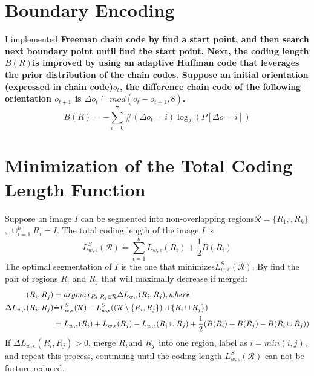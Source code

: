 \documentclass[10pt,twocolumn,letterpaper]{article}
\begin{document}
\section{Boundary Encoding}
I implemented \bf{Freeman chain code} by find a start point, and then search next boundary point until find the start point. Next, the coding length $B(R)$is improved by using an adaptive Huffman code that leverages the prior distribution of the chain codes. Suppose an initial orientation (expressed in chain code)$o_t$, the difference chain code of the following orientation $o_{t+1}$ is $\Delta o_t\dot{=}mod(o_t-o_{t+1}, 8)$.
\begin{equation}
B(R) = -\sum_{i=0}^{7}\#(\Delta o_t = i)\log_2(P[\Delta o=i])
\end{equation}
\section{Minimization of the Total Coding Length Function}
Suppose an image $I$ can be segmented into non-overlapping regions$\mathcal{R}=\{R_1, \dot, R_k\}$, $\cup_{i=1}^{k}R_i=I$. The total coding length of the image $I$ is
\begin{equation}
L_{w,\epsilon}^{S}(\mathcal{R})\dot{=}\sum_{i=1}^{k}L_{w,\epsilon}(R_i)+\frac{1}{2}B(R_i)
\end{equation}
The optimal segmentation of $I$ is the one that minimizes$L_{w,\epsilon}^{S}(\mathcal{R})$. By find the pair of regions $R_i$ and $R_j$ that will maximally decrease if merged:
\begin{equation}
\begin{split}
(R_i^{\*}, R_j^{\*}) &=  argmax_{R_i, R_j\in\mathcal{R}}\Delta L_{w,\epsilon}(R_i, R_j), where\\
\Delta L_{w,\epsilon}(R_i, R_j) &\dot{=} L_{w,\epsilon}^S(\mathcal{R}) - L_{w,\epsilon}^S((\mathcal{R}\setminus \{R_i, R_j\})\cup\{R_i\cup R_j\})\\
&=L_{w,\epsilon}(R_i) + L_{w,\epsilon}(R_j) - L_{w,\epsilon}(R_i\cup R_j) + \frac{1}{2}(B(R_i)+B(R_j) - B(R_i\cup R_j))
\end{split}
\end{equation}
If $\Delta L_{w,\epsilon}(R_i, R_j)>0$, merge $R_i^{\*}$and $R_j^{\*}$ into one region, label as $i = min(i,j)$, and repeat this process, continuing until the coding length $L_{w,\epsilon}^S(\mathcal{R})$ can not be furture reduced.
\end{document}
